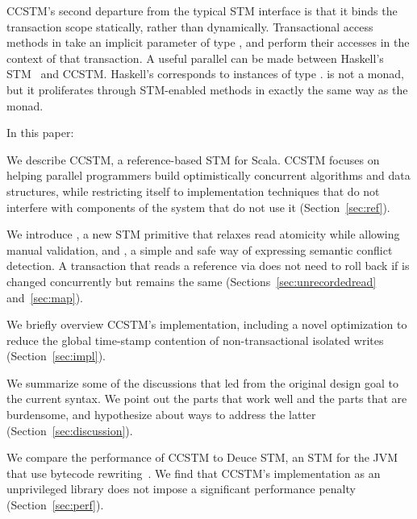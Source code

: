 CCSTM's second departure from the typical STM interface is that it binds the
transaction scope statically, rather than dynamically.  Transactional access
methods in  take an implicit parameter of type , and
perform their accesses in the context of that transaction.
A useful parallel can be made between Haskell's STM~\cite{harris05composable} and CCSTM.
Haskell's  corresponds to instances of type .
 is not a monad, but it proliferates through STM-enabled
methods in exactly the same way as the  monad.

In this paper:
\begin{packed_enum}

\item We describe CCSTM, a reference-based STM for Scala.  CCSTM focuses on
helping parallel programmers build optimistically concurrent algorithms
and data structures, while restricting itself to implementation techniques
that do not interfere with components of the system that do not use it
(Section~\ref{sec:ref}).

\item We introduce , a new STM primitive that relaxes
read atomicity while allowing manual validation, and , a simple
and safe way of expressing semantic conflict detection.  A transaction
that reads a reference  via  does not need to roll
back if  is changed concurrently but  remains
the same (Sections~\ref{sec:unrecordedread} and~\ref{sec:map}).

\item We briefly overview CCSTM's implementation, including a
novel optimization to reduce the global time-stamp contention of
non-transactional isolated writes (Section~\ref{sec:impl}).

\item We summarize some of the discussions that led from the original
design goal to the current syntax.  We point out the parts that work
well and the parts that are burdensome, and hypothesize about ways to
address the latter (Section~\ref{sec:discussion}).

\item We compare the performance of CCSTM to Deuce STM, an STM for
the JVM that use bytecode rewriting~\cite{deucestm}.
We find that CCSTM's implementation as an
unprivileged library does not impose a significant performance penalty
(Section~\ref{sec:perf}).

\end{packed_enum}

